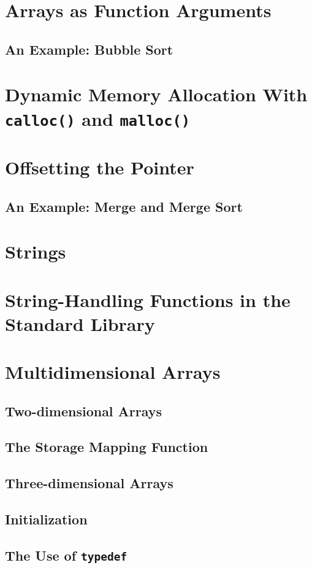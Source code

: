 \documentclass[12pt]{book}
\begin{document}
\section{Arrays as Function Arguments}
\subsection{An Example: Bubble Sort}
\section{Dynamic Memory Allocation With \texttt{calloc()} and \texttt{malloc()}}
\section{Offsetting the Pointer}
\subsection{An Example: Merge and Merge Sort}
\section{Strings}
\section{String-Handling Functions in the Standard Library}
\section{Multidimensional Arrays}
\subsection{Two-dimensional Arrays}
\subsection{The Storage Mapping Function}
\subsection{Three-dimensional Arrays}
\subsection{Initialization}
\subsection{The Use of \texttt{typedef}}
\end{document}
